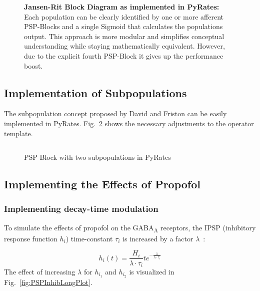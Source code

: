 \begin{figure}[H]

\caption{\textbf{Jansen-Rit Block Diagram as implemented in PyRates:} Each population can be
clearly identified by one or more afferent PSP-Blocks and a
single Sigmoid that calculates the populations output.
This approach is more modular and simplifies conceptual understanding while staying mathematically equivalent.
However, due to the explicit fourth PSP-Block it gives up the performance boost.
}
\label{fig:pyratesJRBlock}
\end{figure}

\subsection{Implementation of Subpopulations}\label{subsec:implementation-of-subpopulations}
The subpopulation concept proposed by David and Friston can be easily implemented in PyRates.
Fig.~\ref{fig:subpop_pyrates} shows the necessary adjustments to the operator template.

\begin{figure}[H]
	\inputminted[mathescape, frame=lines, linenos, fontsize=\footnotesize, baselinestretch=1.2,
        bgcolor=LightGray, tabsize=4]
	{python3}{Chapters/Chapter_02_Theoretical_Concepts/code/psp_subpop.py}
	
	\caption{PSP Block with two subpopulations in PyRates}\label{fig:subpop_pyrates}
\end{figure}


\subsection{Implementing the Effects of Propofol}\label{subsec:implementing-the-effects-of-propofol}

\subsubsection{Implementing decay-time modulation}

To simulate the effects of propofol on the GABA\textsubscript{A}  receptors,
the IPSP (inhibitory response function $h_i$) time-constant $\tau_i$ is increased by a factor
$\lambda$~\cite{hutt_effects_2010}:


\[ h_i(t)=\frac{H_i}{\lambda \cdot \tau_i}te^{-\frac{1}{\lambda \cdot \tau_i}} \]
The effect of increasing $\lambda$ for $h_{i_1}$ and $h_{i_2}$ is visualized in Fig.~\ref{fig:PSPInhibLongPlot}.


